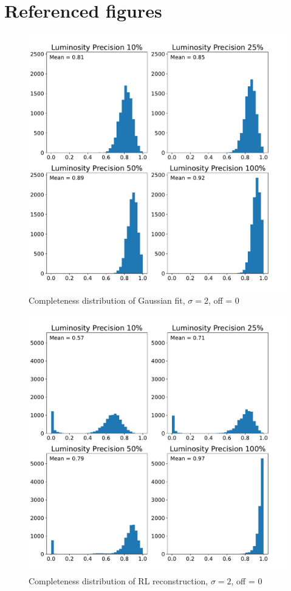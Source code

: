 \documentclass[a4paper]{article}
\begin{document}
	\section{Referenced figures}
		\begin{figure}[h!]
			\centering
			\includegraphics[height=0.4\textheight]{gauss2_hists_gauss.pdf}
			\caption{Completeness distribution of Gaussian fit, $\sigma = 2$, off = 0}
			\label{fig:ghg}
		\end{figure}
		\begin{figure}[h!]
			\centering
			\includegraphics[height=0.4\textheight]{gauss2_hists_lucy.pdf}
			\caption{Completeness distribution of RL reconstruction, $\sigma = 2$, off = 0}
			\label{fig:ghl}
		\end{figure}
\end{document}

